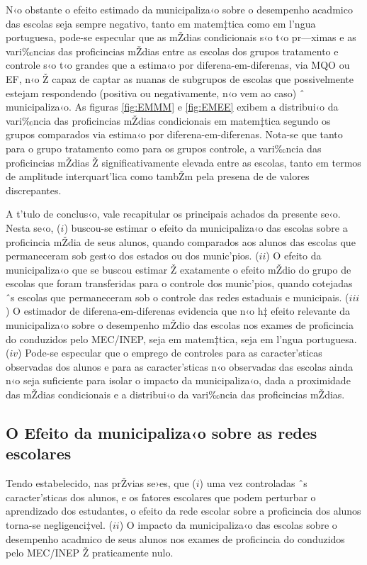 \documentclass[a4paper, 12pt]{article}
\begin{document}
N‹o obstante o efeito estimado da municipaliza‹o sobre o desempenho acadmico das escolas seja sempre negativo, tanto em matem‡tica como em l’ngua portuguesa, pode-se especular que as mŽdias condicionais s‹o t‹o pr—ximas e as vari‰ncias das proficincias mŽdias entre as escolas dos grupos tratamento e controle s‹o t‹o grandes que a estima‹o por diferena-em-diferenas, via MQO ou EF, n‹o Ž capaz de captar as nuanas de subgrupos de escolas que possivelmente estejam respondendo (positiva ou negativamente, n‹o vem ao caso) ˆ municipaliza‹o. As figuras \ref{fig:EMMM} e \ref{fig:EMEE} exibem a distribui‹o da vari‰ncia das proficincias mŽdias condicionais em matem‡tica segundo os grupos comparados via estima‹o por diferena-em-diferenas. Nota-se que tanto para o grupo tratamento como para os grupos controle, a vari‰ncia das proficincias mŽdias Ž significativamente elevada entre as escolas, tanto em termos de amplitude interquart’lica como tambŽm pela presena de de valores discrepantes. 

A t’tulo de conclus‹o, vale recapitular os principais achados da presente se‹o. Nesta se‹o, ($i$) buscou-se estimar o efeito da municipaliza‹o das escolas sobre a proficincia mŽdia de seus alunos, quando comparados aos alunos das escolas que permaneceram sob gest‹o dos estados ou dos munic’pios. ($ii$) O efeito da municipaliza‹o que se buscou estimar Ž exatamente o efeito mŽdio do grupo de escolas que foram transferidas para o controle dos munic’pios, quando cotejadas ˆs escolas que permaneceram sob o controle das redes estaduais e municipais. ($iii$) O estimador de diferena-em-diferenas evidencia que n‹o h‡ efeito relevante da municipaliza‹o sobre o desempenho mŽdio das escolas nos exames de proficincia do conduzidos pelo MEC/INEP, seja em matem‡tica, seja em l’ngua portuguesa. ($iv$) Pode-se especular que o emprego de controles para as caracter’sticas observadas dos alunos e para as caracter’sticas n‹o observadas das escolas ainda n‹o seja suficiente para isolar o impacto da municipaliza‹o, dada a proximidade das mŽdias condicionais e a distribui‹o da vari‰ncia das proficincias mŽdias.   




\pagebreak
\subsection{O Efeito da municipaliza‹o sobre as redes escolares}

Tendo estabelecido, nas prŽvias se›es, que ($i$)  uma vez controladas ˆs caracter’sticas dos alunos, e os fatores escolares que podem perturbar o aprendizado dos estudantes, o efeito da rede escolar sobre a proficincia dos alunos torna-se negligenci‡vel. ($ii$) O impacto da municipaliza‹o das escolas sobre o desempenho acadmico de seus alunos nos exames de proficincia do conduzidos pelo MEC/INEP Ž praticamente nulo.
\end{document}
